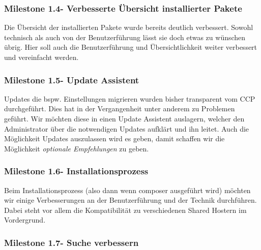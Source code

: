 \documentclass[
paper=a4,
draft=false,%
fontsize=10pt%
]{scrartcl}
\begin{document}
\pagebreak

\subsubsection[Milestone 1.4 - Verbesserte Übersicht installierter Pakete]{Milestone 1.4\footnotemark - Verbesserte Übersicht installierter Pakete}
\label{subsec:ccc-milestone-1.4}

Die Übersicht der installierten Pakete wurde bereits deutlich verbessert. Sowohl technisch als auch von der Benutzerführung lässt sie doch etwas zu wünschen übrig. Hier soll auch die Benutzerführung und Übersichtlichkeit weiter verbessert und vereinfacht werden.

\subsubsection[Milestone 1.5 - Update Assistent]{Milestone 1.5\footnotemark - Update Assistent}
\label{subsec:ccc-milestone-1.5}

Updates die bspw. Einstellungen migrieren wurden bisher transparent vom CCP durchgeführt. Dies hat in der Vergangenheit unter anderem zu Problemen geführt. Wir möchten diese in einen Update Assistent auslagern, welcher den Administrator über die notwendigen Updates aufklärt und ihn leitet. Auch die Möglichkeit Updates auszulassen wird es geben, damit schaffen wir die Möglichkeit \textit{optionale Empfehlungen} zu geben.

\subsubsection[Milestone 1.6 - Installationsprozess]{Milestone 1.6\footnotemark - Installationsprozess}
\label{subsec:ccc-milestone-1.6}

Beim Installationsprozess (also dann wenn composer ausgeführt wird) möchten wir einige Verbesserungen an der Benutzerführung und der Technik durchführen. Dabei steht vor allem die Kompatibilität zu verschiedenen Shared Hostern im Vordergrund.

\subsubsection[Milestone 1.7 - Suche verbessern]{Milestone 1.7\footnotemark - Suche verbessern}
\label{subsec:ccc-milestone-1.7}
\end{document}
